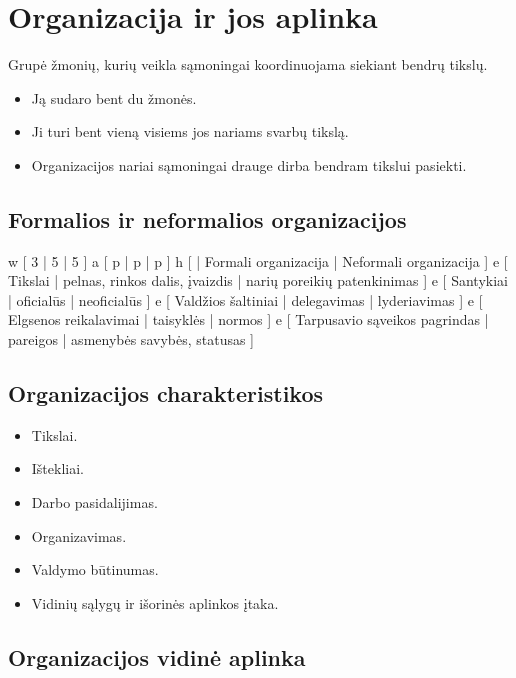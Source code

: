 \chapter{Organizacija ir jos aplinka}

\begin{defn}[Organizacija]
  Grupė žmonių, kurių veikla sąmoningai koordinuojama siekiant bendrų
  tikslų.

  \begin{itemize}
    \item Ją sudaro bent du žmonės.
    \item Ji turi bent vieną visiems jos nariams svarbų tikslą.
    \item Organizacijos nariai sąmoningai drauge dirba bendram tikslui
      pasiekti.
  \end{itemize}
\end{defn}

\section{Formalios ir neformalios organizacijos}

\xtable
{
  w [ 3 | 5 | 5 ]
  a [ p | p | p ]
  h [ | Formali organizacija | Neformali organizacija ]
  e [
    Tikslai | pelnas, rinkos dalis, įvaizdis |
    narių poreikių patenkinimas
    ]
  e [
    Santykiai | oficialūs | neoficialūs
    ]
  e [
    Valdžios šaltiniai | delegavimas | lyderiavimas
    ]
  e [
    Elgsenos reikalavimai | taisyklės | normos
    ]
  e [
    Tarpusavio sąveikos pagrindas | pareigos | asmenybės savybės, statusas
    ]
}

\section{Organizacijos charakteristikos}

\begin{itemize}
  \item Tikslai.
  \item Ištekliai.
  \item Darbo pasidalijimas.
  \item Organizavimas.
  \item Valdymo būtinumas.
  \item Vidinių sąlygų ir išorinės aplinkos įtaka.
\end{itemize}

\section{Organizacijos vidinė aplinka}


